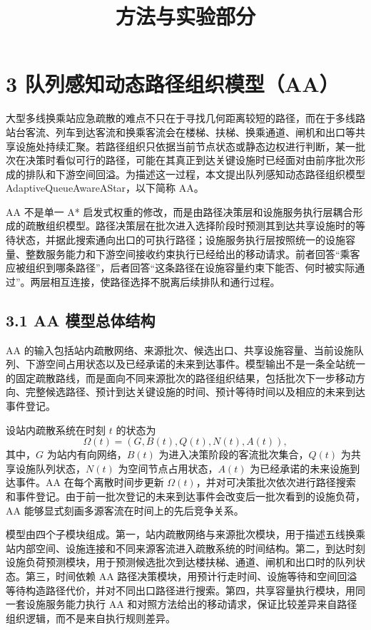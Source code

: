 \documentclass[UTF8,a4paper,12pt]{ctexart}
\title{方法与实验部分}
\author{}
\date{}
\begin{document}
\maketitle

\section{3 队列感知动态路径组织模型（AA）}

大型多线换乘站应急疏散的难点不只在于寻找几何距离较短的路径，而在于多线路站台客流、列车到达客流和换乘客流会在楼梯、扶梯、换乘通道、闸机和出口等共享设施处持续汇聚。若路径组织只依据当前节点状态或静态边权进行判断，某一批次在决策时看似可行的路径，可能在其真正到达关键设施时已经面对由前序批次形成的排队和下游空间回溢。为描述这一过程，本文提出队列感知动态路径组织模型 AdaptiveQueueAwareAStar，以下简称 AA。

AA 不是单一 A* 启发式权重的修改，而是由路径决策层和设施服务执行层耦合形成的疏散组织模型。路径决策层在批次进入选择阶段时预测其到达共享设施时的等待状态，并据此搜索通向出口的可执行路径；设施服务执行层按照统一的设施容量、整数服务能力和下游空间接收约束执行已经给出的移动请求。前者回答“乘客应被组织到哪条路径”，后者回答“这条路径在设施容量约束下能否、何时被实际通过”。两层相互连接，使路径选择不脱离后续排队和通行过程。

\subsection{3.1 AA 模型总体结构}

AA 的输入包括站内疏散网络、来源批次、候选出口、共享设施容量、当前设施队列、下游空间占用状态以及已经承诺的未来到达事件。模型输出不是一条全站统一的固定疏散路线，而是面向不同来源批次的路径组织结果，包括批次下一步移动方向、完整候选路径、预计到达关键设施的时间、预计等待时间以及相应的未来到达事件登记。

设站内疏散系统在时刻 \(t\) 的状态为
\[
\Omega(t)=\left(G,B(t),Q(t),N(t),A(t)\right),
\]
其中，\(G\) 为站内有向网络，\(B(t)\) 为进入决策阶段的客流批次集合，\(Q(t)\) 为共享设施队列状态，\(N(t)\) 为空间节点占用状态，\(A(t)\) 为已经承诺的未来设施到达事件。AA 在每个离散时间步更新 \(\Omega(t)\)，并对可决策批次依次进行路径搜索和事件登记。由于前一批次登记的未来到达事件会改变后一批次看到的设施负荷，AA 能够显式刻画多源客流在时间上的先后竞争关系。

模型由四个子模块组成。第一，站内疏散网络与来源批次模块，用于描述五线换乘站内部空间、设施连接和不同来源客流进入疏散系统的时间结构。第二，到达时刻设施负荷预测模块，用于预测候选批次到达楼扶梯、通道、闸机和出口时的队列状态。第三，时间依赖 AA 路径决策模块，用预计行走时间、设施等待和空间回溢等待构造路径代价，并对不同出口路径进行搜索。第四，共享容量执行模块，用同一套设施服务能力执行 AA 和对照方法给出的移动请求，保证比较差异来自路径组织逻辑，而不是来自执行规则差异。
\end{document}
